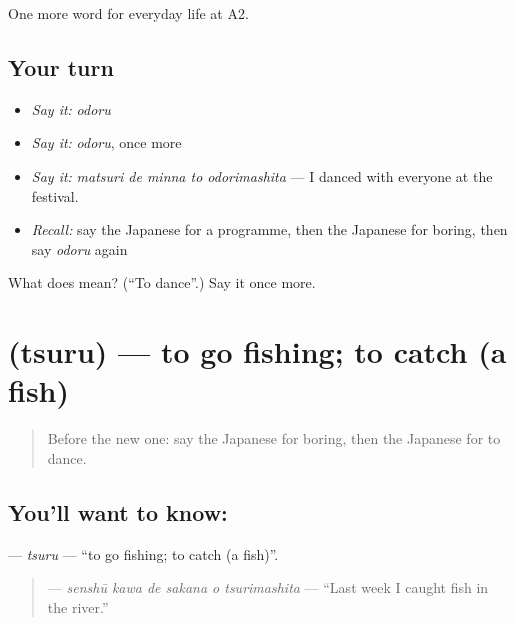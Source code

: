 \begin{grammarlens}[title={What you've built}]
One more word for everyday life at A2.
\end{grammarlens}

\subsection*{Your turn}
\begin{itemize}
\raggedright
  \item \emph{Say it:} \emph{odoru}
  \item \emph{Say it:} \emph{odoru}, once more
  \item \emph{Say it:} \emph{matsuri de minna to odorimashita} — I danced with everyone at the festival.
  \item \emph{Recall:} say the Japanese for a programme, then the Japanese for boring, then say \emph{odoru} again
\end{itemize}

\begin{tcolorbox}[breakable,colback=teal!4,colframe=teal!35!black,title={Before you move on}]
What does  mean? (\textquotedblleft{}To dance\textquotedblright{}.) Say it once more.
\end{tcolorbox}
\section[\texorpdfstring{\ja{つる} (tsuru)}{つる (tsuru)}]{ (tsuru) — to go fishing; to catch (a fish)}

\label{lesson:JA-C239-tsuru}



\begin{quote}
Before the new one: say the Japanese for boring, then the Japanese for to dance.
\end{quote}

\subsection*{You'll want to know: }
\textbf{} — \emph{tsuru} — \textquotedblleft{}to go fishing; to catch (a fish)\textquotedblright{}.

\begin{quote}
\textbf{   } — \emph{senshū kawa de sakana o tsurimashita} — \textquotedblleft{}Last week I caught fish in the river.\textquotedblright{}
\end{quote}

